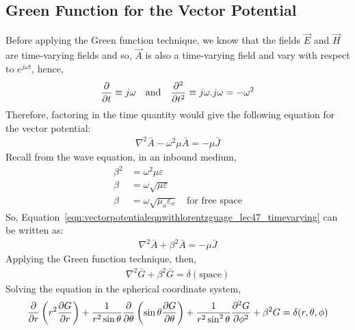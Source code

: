 \subsection{Green Function for the Vector Potential}
Before applying the Green function technique, we know that the fields $\vec{E}$ and $\vec{H}$ are time-varying fields and so, $\vec{A}$ is also a time-varying field and vary with respect to $e^{j\omega t}$, hence,
\begin{align*}
\partialderivative{}{t} \equiv j\omega\quad\text{and}\quad\partialderivative[2]{}{t} \equiv j\omega.j\omega = -\omega^{2}
\end{align*}
Therefore, factoring in the time quantity would give the following equation for the vector potential:
\begin{align}
\nabla^{2}\bar{A}-\omega^{2}\mu\bar{A} = -\mu\bar{J}
\label{eqn:vectorpotentialeqnwithlorentzguage_lec47_timevarying}
\end{align}
Recall from the wave equation, in an inbound medium,
\begin{align*}
\beta^{2} &= \omega^{2}\mu \varepsilon\\
\beta &= \omega\sqrt{\mu \varepsilon}\\
\beta &= \omega\sqrt{\mu_o \varepsilon_o}\quad\text{for free space}
\end{align*}
So, Equation~\eqref{eqn:vectorpotentialeqnwithlorentzguage_lec47_timevarying} can be written as:
\begin{align*}
\nabla^{2}\bar{A}+\beta^{2}\bar{A} = -\mu\bar{J}
\end{align*}
Applying the Green function technique, then,
\begin{align*}
\nabla^{2}\bar{G}+\beta^{2}\bar{G} = \delta(\text{space})
\end{align*}
Solving the equation in the spherical coordinate system,
\begin{dmath*}
\partialderivative{}{r} \left(r^{2} \partialderivative{G}{r} \right) + \frac{1}{r^2 \sin \theta} \partialderivative{}{\theta}\left(\sin \theta \partialderivative{G}{\theta}\right) + \frac{1}{r^{2}\sin^{2}\theta} \partialderivative[2]{G}{\phi} + \beta^{2}G = \delta(r,\theta,\phi)
\end{dmath*}

